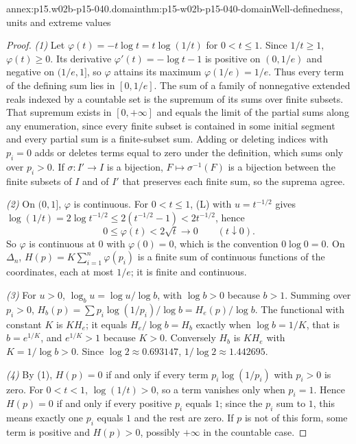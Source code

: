\begin{annexitem}{annex:p15.w02b-p15-040.domain}{thm:p15-w02b-p15-040-domain}{Well-definedness, units and extreme values}
\begin{proof}
\emph{(1)} Let \(\varphi(t)=-t\log t=t\log(1/t)\) for \(0<t\leq1\).
Since \(1/t\geq1\), \(\varphi(t)\geq0\). Its derivative
\(\varphi'(t)=-\log t-1\) is positive on \((0,1/e)\) and negative on
\((1/e,1]\), so \(\varphi\) attains its maximum \(\varphi(1/e)=1/e\).
Thus every term of the defining sum lies in \([0,1/e]\). The sum of a
family of nonnegative extended reals indexed by a countable set is the
supremum of its sums over finite subsets. That supremum exists in
\([0,+\infty]\) and equals the limit of the partial sums along any
enumeration, since every finite subset is contained in some initial
segment and every partial sum is a finite-subset sum. Adding or deleting
indices with \(p_i=0\) adds or deletes terms equal to zero under the
definition, which sums only over \(p_i>0\). If \(\sigma:I'\to I\) is a
bijection, \(F\mapsto\sigma^{-1}(F)\) is a bijection between the finite
subsets of \(I\) and of \(I'\) that preserves each finite sum, so the
suprema agree.

\emph{(2)} On \((0,1]\), \(\varphi\) is continuous. For
\(0<t\leq1\), (L) with \(u=t^{-1/2}\) gives
\(\log(1/t)=2\log t^{-1/2}\leq2(t^{-1/2}-1)<2t^{-1/2}\), hence
\[
 0\leq\varphi(t)<2\sqrt t\longrightarrow0\qquad(t\downarrow0).
\]
So \(\varphi\) is continuous at \(0\) with \(\varphi(0)=0\), which is
the convention \(0\log0=0\). On \(\Delta_n\),
\(H(p)=K\sum_{i=1}^n\varphi(p_i)\) is a finite sum of continuous
functions of the coordinates, each at most \(1/e\); it is finite and
continuous.

\emph{(3)} For \(u>0\), \(\log_bu=\log u/\log b\), with
\(\log b>0\) because \(b>1\). Summing over \(p_i>0\),
\(H_b(p)=\sum p_i\log(1/p_i)/\log b=H_e(p)/\log b\). The functional
with constant \(K\) is \(KH_e\); it equals \(H_e/\log b=H_b\) exactly
when \(\log b=1/K\), that is \(b=e^{1/K}\), and \(e^{1/K}>1\) because
\(K>0\). Conversely \(H_b\) is \(KH_e\) with \(K=1/\log b>0\). Since
\(\log2\approx0.693147\), \(1/\log2\approx1.442695\).

\emph{(4)} By (1), \(H(p)=0\) if and only if every term
\(p_i\log(1/p_i)\) with \(p_i>0\) is zero. For \(0<t<1\),
\(\log(1/t)>0\), so a term vanishes only when \(p_i=1\). Hence
\(H(p)=0\) if and only if every positive \(p_i\) equals \(1\); since the
\(p_i\) sum to \(1\), this means exactly one \(p_i\) equals \(1\) and
the rest are zero. If \(p\) is not of this form, some term is positive
and \(H(p)>0\), possibly \(+\infty\) in the countable case.


\end{proof}
\end{annexitem}
